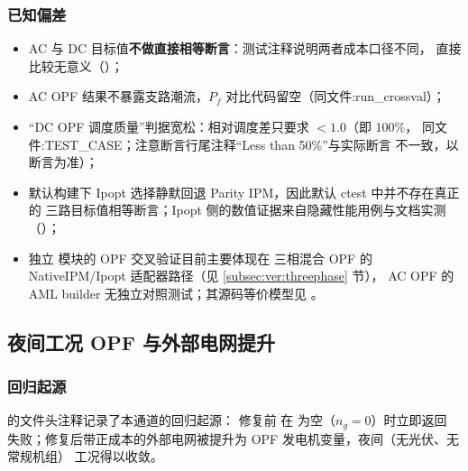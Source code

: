 \subsubsection*{已知偏差}
\begin{itemize}
  \item AC 与 DC 目标值\textbf{不做直接相等断言}：测试注释说明两者成本口径不同，
        直接比较无意义（）；
  \item AC OPF 结果不暴露支路潮流，$P_f$ 对比代码留空（同文件:run\_crossval）；
  \item “DC OPF 调度质量”判据宽松：相对调度差只要求 $<1.0$（即 100\%，
        同文件:TEST\_CASE；注意断言行尾注释“Less than 50\%”与实际断言 
        不一致，以断言为准）；
  \item 默认构建下 Ipopt 选择静默回退 Parity IPM，因此默认 ctest 中并不存在真正的
        三路目标值相等断言；Ipopt 侧的数值证据来自隐藏性能用例与文档实测
        （）；
  \item 独立  模块的 OPF 交叉验证目前主要体现在
        三相混合 OPF 的 NativeIPM/Ipopt 适配器路径（见 \ref{subsec:ver:threephase} 节），
        AC OPF 的 AML builder 无独立对照测试；其源码等价模型见
        。
\end{itemize}

\subsection{夜间工况 OPF 与外部电网提升}\label{subsec:ver:nighttime}

\subsubsection*{回归起源}
 的文件头注释记录了本通道的回归起源：
修复前  在  为空（$n_g=0$）时立即返回
失败；修复后带正成本的外部电网被提升为 OPF 发电机变量，夜间（无光伏、无常规机组）
工况得以收敛。

